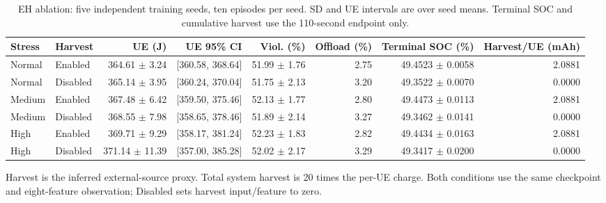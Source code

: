 \begin{table}[t]
\centering\footnotesize
\caption{EH ablation: five independent training seeds, ten episodes per seed. SD and UE intervals are over seed means. Terminal SOC and cumulative harvest use the 110-second endpoint only.}
\label{tab:eh}
\begin{tabular}{@{}llrrrrrr@{}}\toprule
Stress & Harvest & UE (J) & UE 95\% CI & Viol. (\%) & Offload (\%) & Terminal SOC (\%) & Harvest/UE (mAh)\\\midrule
Normal & Enabled & 364.61 $\pm$ 3.24 & [360.58, 368.64] & 51.99 $\pm$ 1.76 & 2.75 & 49.4523 $\pm$ 0.0058 & 2.0881 \\
Normal & Disabled & 365.14 $\pm$ 3.95 & [360.24, 370.04] & 51.75 $\pm$ 2.13 & 3.20 & 49.3522 $\pm$ 0.0070 & 0.0000 \\
Medium & Enabled & 367.48 $\pm$ 6.42 & [359.50, 375.46] & 52.13 $\pm$ 1.77 & 2.80 & 49.4473 $\pm$ 0.0113 & 2.0881 \\
Medium & Disabled & 368.55 $\pm$ 7.98 & [358.65, 378.46] & 51.89 $\pm$ 2.14 & 3.27 & 49.3462 $\pm$ 0.0141 & 0.0000 \\
High & Enabled & 369.71 $\pm$ 9.29 & [358.17, 381.24] & 52.23 $\pm$ 1.83 & 2.82 & 49.4434 $\pm$ 0.0163 & 2.0881 \\
High & Disabled & 371.14 $\pm$ 11.39 & [357.00, 385.28] & 52.02 $\pm$ 2.17 & 3.29 & 49.3417 $\pm$ 0.0200 & 0.0000 \\
\bottomrule\end{tabular}

\par\smallskip\begin{minipage}{\textwidth}\footnotesize Harvest is the inferred external-source proxy. Total system harvest is 20 times the per-UE charge. Both conditions use the same checkpoint and eight-feature observation; Disabled sets harvest input/feature to zero.\end{minipage}
\end{table}
